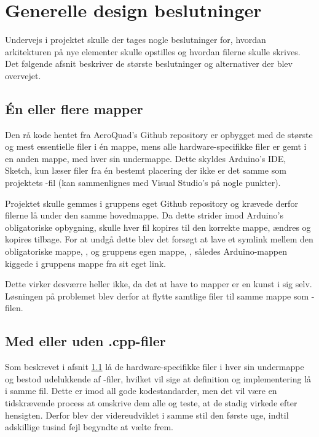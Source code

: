 \documentclass[Main]{subfiles}
\begin{document}
\section{Generelle design beslutninger}
Undervejs i projektet skulle der tages nogle beslutninger for, hvordan arkitekturen på nye elementer skulle opstilles og hvordan filerne skulle skrives. 
Det følgende afsnit beskriver de største beslutninger og alternativer der blev overvejet.

\subsection{Én eller flere mapper}\label{Sec:en-flere}
Den rå kode hentet fra AeroQuad's Github repository \cite{Github-AQ} er opbygget med de største og mest essentielle filer i én mappe, mens alle hardware-specifikke filer er gemt i en anden mappe, med hver sin undermappe.
Dette skyldes Arduino's IDE, Sketch, kun læser filer fra én bestemt placering der ikke er det samme som projektets -fil (kan sammenlignes med Visual Studio's  på nogle punkter).

Projektet skulle gemmes i gruppens eget Github repository \cite{Github-IHA} og krævede derfor filerne lå under den samme hovedmappe.
Da dette strider imod Arduino's obligatoriske opbygning, skulle hver fil kopires til den korrekte mappe, ændres og kopires tilbage.
For at undgå dette blev det forsøgt at lave et symlink\cite{symlink} mellem den obligatoriske mappe, , og gruppens egen mappe, , således Arduino-mappen kiggede i gruppens mappe fra sit eget link.

Dette virker desværre heller ikke, da det at have to mapper er en kunst i sig selv.
Løsningen på problemet blev derfor at flytte samtlige filer til samme mappe som -filen.



\subsection{Med eller uden .cpp-filer}\label{Sec:cpp-filer}
Som beskrevet i afsnit \ref{Sec:en-flere} lå de hardware-specifikke filer i hver sin undermappe og bestod udelukkende af -filer, hvilket vil sige at definition og implementering lå i samme fil.
Dette er imod all gode kodestandarder, men det vil være en tidskrævende process at omskrive dem alle og teste, at de stadig virkede efter hensigten.
Derfor blev der videreudviklet i samme stil den første uge, indtil adskillige tusind fejl begyndte at vælte frem.
\end{document}
